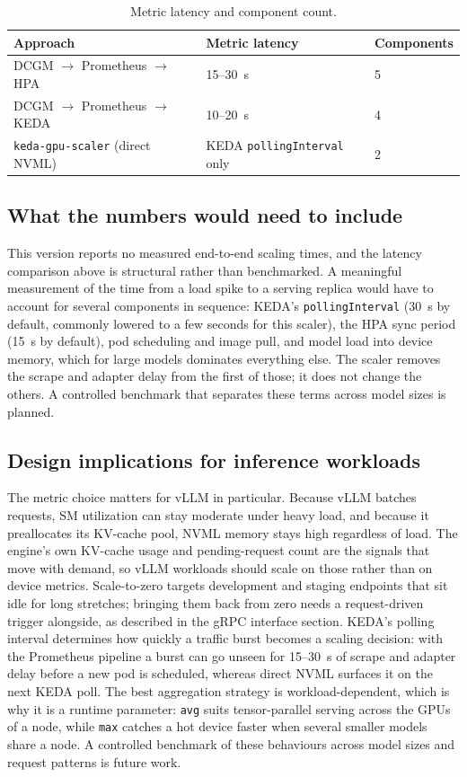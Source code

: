 \documentclass[11pt]{article}
\begin{document}
\begin{table}[h]
\centering
\begin{tabular}{L{0.42\textwidth} l l}
\toprule
\textbf{Approach} & \textbf{Metric latency} & \textbf{Components} \\
\midrule
DCGM $\rightarrow$ Prometheus $\rightarrow$ HPA & 15--30~s & 5 \\
DCGM $\rightarrow$ Prometheus $\rightarrow$ KEDA & 10--20~s & 4 \\
\texttt{keda-gpu-scaler} (direct NVML) & KEDA \texttt{pollingInterval} only & 2 \\
\bottomrule
\end{tabular}
\caption{Metric latency and component count.}
\label{tab:latency}
\end{table}

\subsection{What the numbers would need to include}
This version reports no measured end-to-end scaling times, and the latency
comparison above is structural rather than benchmarked. A meaningful measurement
of the time from a load spike to a serving replica would have to account for
several components in sequence: KEDA's \texttt{pollingInterval} (30~s by
default, commonly lowered to a few seconds for this scaler), the HPA sync period
(15~s by default), pod scheduling and image pull, and model load into device
memory, which for large models dominates everything else. The scaler removes the
scrape and adapter delay from the first of those; it does not change the others.
A controlled benchmark that separates these terms across model sizes is planned.

\subsection{Design implications for inference workloads}
The metric choice matters for vLLM in particular. Because vLLM batches requests,
SM utilization can stay moderate under heavy load, and because it preallocates
its KV-cache pool, NVML memory stays high regardless of load. The engine's own
KV-cache usage and pending-request count are the signals that move with demand,
so vLLM workloads should scale on those rather than on device metrics.
Scale-to-zero targets development and staging endpoints that sit idle for long
stretches; bringing them back from zero needs a request-driven trigger alongside,
as described in the gRPC interface section. KEDA's polling interval determines how quickly a traffic
burst becomes a scaling decision: with the Prometheus pipeline a burst can go
unseen for 15--30~s of scrape and adapter delay before a new pod is scheduled,
whereas direct NVML surfaces it on the next KEDA poll. The best aggregation strategy is
workload-dependent, which is why it is a runtime parameter: \texttt{avg} suits
tensor-parallel serving across the GPUs of a node, while \texttt{max} catches a
hot device faster when several smaller models share a node. A controlled
benchmark of these behaviours across model sizes and request patterns is
future work.
\end{document}
